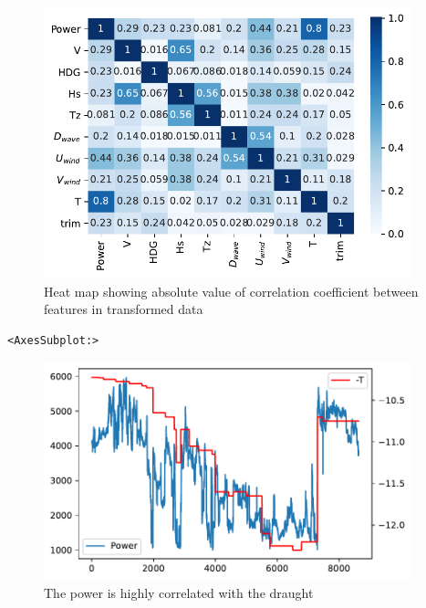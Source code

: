 \begin{figure}[H]
\begin{center}\includegraphics[width = 0.95\textwidth]{figures/heat_map_data.pdf}\end{center}
\vspace{-0.7cm}
\caption{Heat map showing absolute value of correlation coefficient between features in transformed data}
\label{fig:heat_map_data}
\end{figure}
\begin{verbatim}
<AxesSubplot:>
\end{verbatim}
\begin{figure}[H]
\begin{center}\includegraphics[width = 0.95\textwidth]{figures/power_draught.pdf}\end{center}
\vspace{-0.7cm}
\caption{The power is highly correlated with the draught}
\label{fig:power_draught}
\end{figure}

